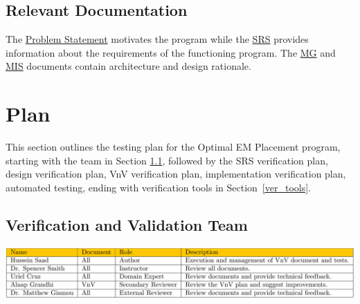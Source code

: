 \documentclass[12pt, titlepage]{article}
\begin{document}
\subsection{Relevant Documentation}
The \href{https://github.com/husseinsd1/optimal-em-arrangement/blob/main/docs/ProblemStatementAndGoals/ProblemStatement.pdf}{Problem Statement} motivates the program while the \href{https://github.com/husseinsd1/optimal-em-arrangement/blob/main/docs/SRS/SRS.pdf}{SRS} provides information about the requirements of the functioning program. The \href{https://github.com/husseinsd1/optimal-em-arrangement/blob/main/docs/Design/SoftArchitecture/MG.pdf}{MG} and \href{https://github.com/husseinsd1/optimal-em-arrangement/blob/main/docs/Design/SoftDetailedDes/MIS.pdf}{MIS} documents contain architecture and design rationale. 

\section{Plan}
This section outlines the testing plan for the Optimal EM Placement program, starting with the team in Section \ref{team}, followed by the SRS verification plan, design verification plan, VnV verification plan, implementation verification plan, automated testing, ending with verification tools in Section~\ref{ver_tools}.

\subsection{Verification and Validation Team} \label{team}
\begin{center}
  \includegraphics[scale=0.36]{VnVTeam.PNG} \label{team_table}
\end{center}
\end{document}
